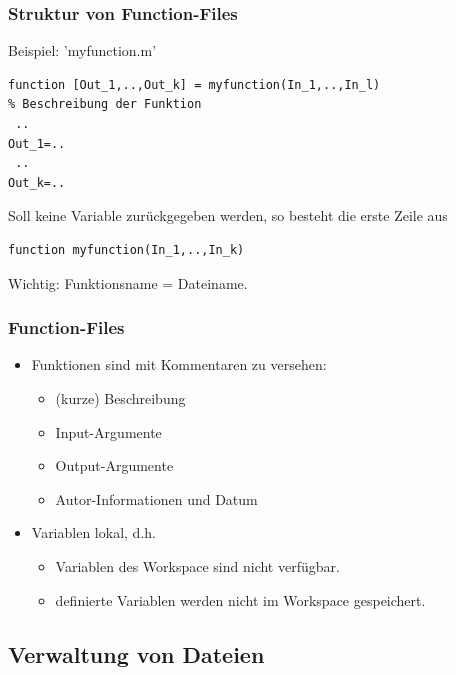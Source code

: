 \documentclass[hyperref={xetex}]{beamer}
\begin{document}
\begin{frame}[fragile]\frametitle{Struktur von Function-Files}
Beispiel: 'myfunction.m'
\begin{lstlisting}
function [Out_1,..,Out_k] = myfunction(In_1,..,In_l)
% Beschreibung der Funktion
 ..
Out_1=..
 ..
Out_k=..
\end{lstlisting}
Soll keine Variable zurückgegeben werden, so besteht die erste Zeile aus
\begin{lstlisting}
function myfunction(In_1,..,In_k)
\end{lstlisting}

\alert{Wichtig:} Funktionsname = Dateiname.
\end{frame}
\begin{frame}[fragile]\frametitle{Function-Files}
\begin{itemize}
\item Funktionen sind mit Kommentaren zu versehen:
\begin{itemize}
\item (kurze) Beschreibung
\item Input-Argumente
\item Output-Argumente
\item Autor-Informationen und Datum
\end{itemize}
\item Variablen lokal, d.h.
\begin{itemize}
 \item Variablen des Workspace sind  nicht verfügbar.
\item definierte Variablen werden nicht im  Workspace gespeichert.
\end{itemize}
 
\end{itemize}
\end{frame}

\subsection{Verwaltung von Dateien}
\end{document}
